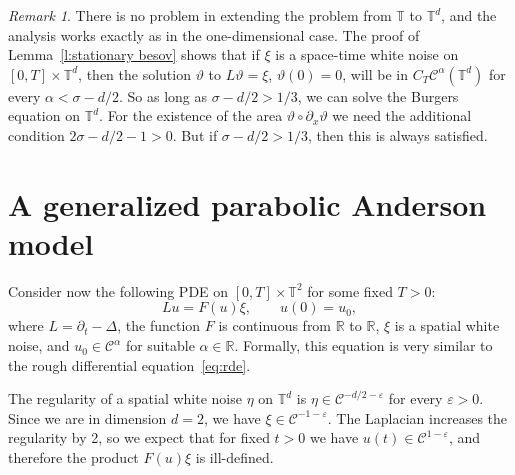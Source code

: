 \documentclass[11pt,a4paper]{article}
\theoremstyle{remark}
\newtheorem{remark}[theorem]{Remark}
\newcommand{\R}{\mathbb{R}}
\newcommand{\CC}{\ensuremath{\mathscr{C}}}
\begin{document}
\begin{remark}
   There is no problem in extending the problem from $\mathbb{T}$ to $\mathbb{T}^d$, %
   and the analysis works exactly as in the one-dimensional case. The proof of Lemma~\ref{l:stationary besov} shows that if $\xi$ is a space-time white noise on $[0,T] \times \mathbb{T}^d$, then the solution $\vartheta$ to $L \vartheta = \xi$, $\vartheta(0) = 0$, will be in $C_T\CC^\alpha(\mathbb{T}^d)$ for every $\alpha < \sigma - d/2$. So as long as $\sigma - d/2 > 1/3$, we can solve the Burgers equation on $\mathbb{T}^d$. For the existence of the area $\vartheta \circ \partial_x \vartheta$ we need the additional condition $2 \sigma - d/2 - 1 > 0$. But if $\sigma - d/2 > 1/3$, then this is always satisfied. 
\end{remark}



\section{A generalized parabolic Anderson model}\label{sec:PAM}

Consider now the following PDE on $[ 0,T ] \times \mathbb{T}^{2}$ for some fixed $T>0$:
\begin{equation}\label{eq:pam}
  L u=F ( u ) \xi, \qquad u(0) = u_0,
\end{equation}
where $L = \partial_{t} - \Delta$, the function $F$ is continuous from
$\mathbb{R}$ to $\mathbb{R}$, $\xi$ is a spatial white noise, and $u_0 \in \CC^\alpha$ for suitable $\alpha \in \R$.
Formally, this equation is very similar to the rough differential
equation~{\eqref{eq:rde}}.

The regularity of a spatial white noise $\eta$ on $\mathbb{T}^{d}$ is $\eta \in \CC^{-d/2- \varepsilon}$ for every $\varepsilon >0$. Since we are
in dimension $d=2$, we have $\xi \in \CC^{-1- \varepsilon}$. The
Laplacian increases the regularity by 2, so we expect that for fixed $t>0$ we
have $u ( t ) \in \CC^{1- \varepsilon}$, and therefore the product
$F ( u ) \xi$ is ill-defined.
\end{document}
